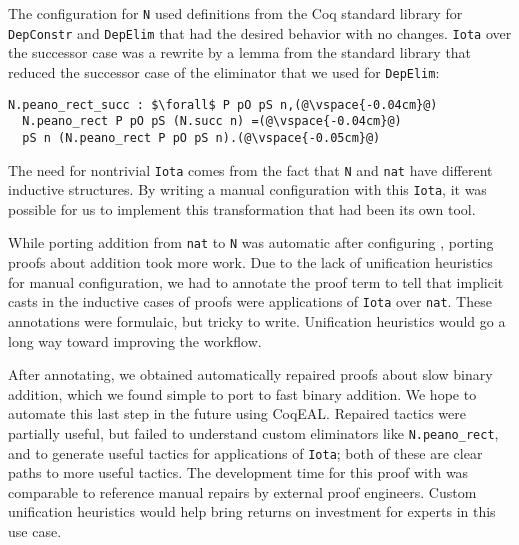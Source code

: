 The configuration for \lstinline{N} used definitions from the Coq standard library
for \lstinline{DepConstr} and \lstinline{DepElim} that had the desired behavior with no changes.
\lstinline{Iota} over the successor case was a rewrite by a lemma
from the standard library that reduced the successor case of the eliminator that we used for \lstinline{DepElim}:

\begin{lstlisting}
N.peano_rect_succ : $\forall$ P pO pS n,(@\vspace{-0.04cm}@)
  N.peano_rect P pO pS (N.succ n) =(@\vspace{-0.04cm}@)
  pS n (N.peano_rect P pO pS n).(@\vspace{-0.05cm}@)
\end{lstlisting}
%
The need for nontrivial \lstinline{Iota} comes from the fact that \lstinline{N} and \lstinline{nat}
have different inductive structures.
By writing a manual configuration with this \lstinline{Iota}, it was possible for us to implement this transformation 
that had been its own tool.

While porting addition from \lstinline{nat} to \lstinline{N} was automatic after configuring \toolname,
porting proofs about addition took more work.
Due to the lack of unification heuristics for manual configuration,
we had to annotate the proof term to tell \toolname that implicit casts in the inductive cases of proofs were applications of \lstinline{Iota}
over \lstinline{nat}.
These annotations were formulaic, but tricky to write.
Unification heuristics would go a long way toward improving the workflow. %

After annotating, we obtained automatically repaired proofs about slow binary addition,
which we found simple to port to fast binary addition.
We hope to automate this last step in the future using CoqEAL. %
Repaired tactics were partially useful, but failed to understand custom eliminators like \lstinline{N.peano_rect}, and to generate useful
tactics for applications of \lstinline{Iota}; both of these are clear paths to more useful tactics.
The development time for this proof with \toolname was comparable to reference manual repairs by external proof engineers.
Custom unification heuristics would help bring returns on investment for experts in this use case.

